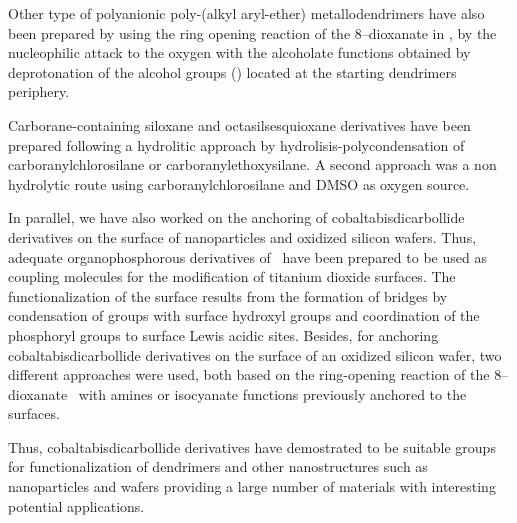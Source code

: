 Other type of polyanionic poly-(alkyl aryl-ether) metallodendrimers have also been prepared by using the ring opening reaction of the 8--dioxanate in \cdiox, by the nucleophilic attack to the oxygen with the alcoholate functions obtained by deprotonation of the alcohol groups () located at the starting dendrimers periphery.

Carborane-containing siloxane and octasilsesquioxane derivatives have been prepared following a hydrolitic approach by hydrolisis-polycondensation of carboranylchlorosilane or carboranylethoxysilane. A second approach was a non hydrolytic route using carboranylchlorosilane and DMSO as oxygen source.
 
In parallel, we have also worked on the anchoring of cobaltabisdicarbollide derivatives on the surface of  nanoparticles and oxidized silicon wafers. Thus, adequate organophosphorous derivatives of \cosane\ have been prepared to be used as coupling molecules for the modification of titanium dioxide surfaces. The functionalization of the surface results from the formation of  bridges by condensation of  groups with surface hydroxyl groups and coordination of the phosphoryl groups to surface Lewis acidic sites. Besides, for anchoring cobaltabisdicarbollide derivatives on the surface of an oxidized silicon wafer, two different approaches were used, both based on the ring-opening reaction of the 8--dioxanate \cdiox\ with amines or isocyanate functions previously anchored to the surfaces.

Thus, cobaltabisdicarbollide derivatives  have demostrated to be suitable groups for functionalization of dendrimers and other nanostructures  such as nanoparticles and wafers providing a large number of materials with interesting potential applications.






